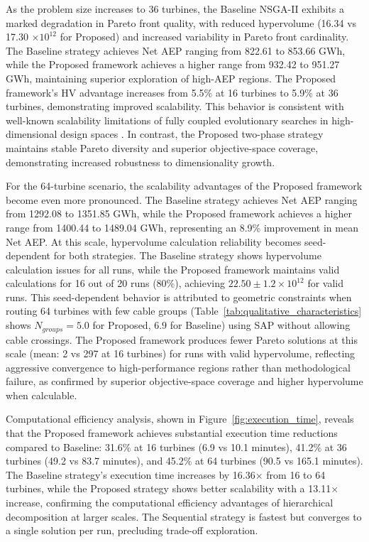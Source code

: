 \documentclass[format=sigconf,anonymous=true,review=true]{acmart}
\begin{document}
As the problem size increases to 36 turbines, the Baseline NSGA-II exhibits a marked degradation in Pareto front quality, with reduced hypervolume (16.34 vs 17.30 $\times 10^{12}$ for Proposed) and increased variability in Pareto front cardinality. The Baseline strategy achieves Net AEP ranging from 822.61 to 853.66 GWh, while the Proposed framework achieves a higher range from 932.42 to 951.27 GWh, maintaining superior exploration of high-AEP regions. The Proposed framework's HV advantage increases from 5.5\% at 16 turbines to 5.9\% at 36 turbines, demonstrating improved scalability. This behavior is consistent with well-known scalability limitations of fully coupled evolutionary searches in high-dimensional design spaces \cite{Haupt2004, Nocedal2006}. In contrast, the Proposed two-phase strategy maintains stable Pareto diversity and superior objective-space coverage, demonstrating increased robustness to dimensionality growth.

For the 64-turbine scenario, the scalability advantages of the Proposed framework become even more pronounced. The Baseline strategy achieves Net AEP ranging from 1292.08 to 1351.85 GWh, while the Proposed framework achieves a higher range from 1400.44 to 1489.04 GWh, representing an 8.9\% improvement in mean Net AEP. At this scale, hypervolume calculation reliability becomes seed-dependent for both strategies. The Baseline strategy shows hypervolume calculation issues for all runs, while the Proposed framework maintains valid calculations for 16 out of 20 runs (80\%), achieving $22.50 \pm 1.2 \times 10^{12}$ for valid runs. This seed-dependent behavior is attributed to geometric constraints when routing 64 turbines with few cable groups (Table~\ref{tab:qualitative_characteristics} shows $N_{groups} = 5.0$ for Proposed, $6.9$ for Baseline) using SAP without allowing cable crossings. The Proposed framework produces fewer Pareto solutions at this scale (mean: 2 vs 297 at 16 turbines) for runs with valid hypervolume, reflecting aggressive convergence to high-performance regions rather than methodological failure, as confirmed by superior objective-space coverage and higher hypervolume when calculable.

Computational efficiency analysis, shown in Figure~\ref{fig:execution_time}, reveals that the Proposed framework achieves substantial execution time reductions compared to Baseline: 31.6\% at 16 turbines (6.9 vs 10.1 minutes), 41.2\% at 36 turbines (49.2 vs 83.7 minutes), and 45.2\% at 64 turbines (90.5 vs 165.1 minutes). The Baseline strategy's execution time increases by 16.36$\times$ from 16 to 64 turbines, while the Proposed strategy shows better scalability with a 13.11$\times$ increase, confirming the computational efficiency advantages of hierarchical decomposition at larger scales. The Sequential strategy is fastest but converges to a single solution per run, precluding trade-off exploration.
\end{document}
